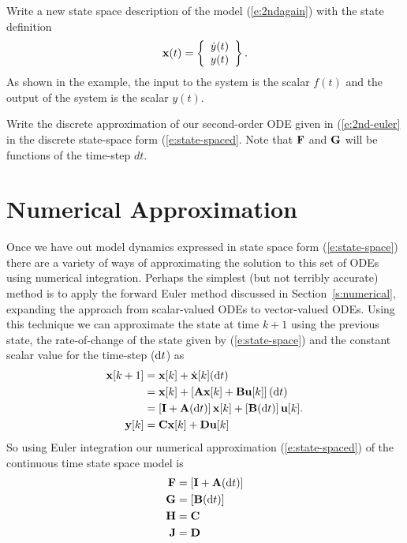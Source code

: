\begin{ex}
Write a new state space description of the model (\ref{e:2ndagain}) with the state definition
\[
\mbox{${\bf x}$}(t)  =  \left\{ \begin{array}{c}
\dot{y}(t) \\
y(t)
\end{array} \right\}.
\]
As shown in the example, the input to the system is the scalar $f(t)$ and the output of the system is the scalar $y(t)$. 
\end{ex}

\begin{ex}
Write the discrete approximation of our second-order ODE given in (\ref{e:2nd-euler} in the discrete state-space form (\ref{e:state-spaced}.  Note that $\mbox{${\bf F}$}$ and $\mbox{${\bf G}$}$ will be functions of the time-step $dt$.
\end{ex}


\section{Numerical Approximation}
Once we have out model dynamics expressed in state space form (\ref{e:state-space}) there are a variety of ways of approximating the solution to this set of ODEs using numerical integration.  Perhaps the simplest (but not terribly accurate) method is to apply the forward Euler method discussed in Section~\ref{s:numerical}, expanding the approach from scalar-valued ODEs to vector-valued ODEs.  Using this technique we can approximate the state at time $k+1$ using the previous state, the rate-of-change of the state given by (\ref{e:state-space}) and the constant scalar value for the time-step ($\mathrm{d}t$) as
\begin{align}
\label{e:state-space-euler}
\mbox{${\bf x}$}[k+1] & = \mbox{${\bf x}$}[k] + \dot{\mbox{${\bf x}$}}[k](\mathrm{d}t) \nonumber \\
           & = \mbox{${\bf x}$}[k] + \left[\mbox{${\bf A}$}\mbox{${\bf x}$}[k]+\mbox{${\bf B}$}\mbox{${\bf u}$}[k]\right](\mathrm{d}t) \nonumber \\
           & = \left[\mbox{${\bf I}$}+\mbox{${\bf A}$}(\mathrm{d}t)\right]\mbox{${\bf x}$}[k] + \left[\mbox{${\bf B}$}(\mathrm{d}t)\right]\mbox{${\bf u}$}[k]. \nonumber \\
\mbox{${\bf y}$}[k] & = \mbox{${\bf C}$}\mbox{${\bf x}$}[k] + \mbox{${\bf D}$}\mbox{${\bf u}$}[k]
\end{align}
So using Euler integration our numerical approximation (\ref{e:state-spaced}) of the continuous time state space model is
\begin{align}
\label{e:state-space-euler2}
\mbox{${\bf F}$} & = \left[\mbox{${\bf I}$}+\mbox{${\bf A}$}(\mathrm{d}t)\right] \nonumber \\
\mbox{${\bf G}$} & = \left[\mbox{${\bf B}$}(\mathrm{d}t)\right] \nonumber \\
\mbox{${\bf H}$} & = \mbox{${\bf C}$} \nonumber \\
\mbox{${\bf J}$} & = \mbox{${\bf D}$}
\end{align}

